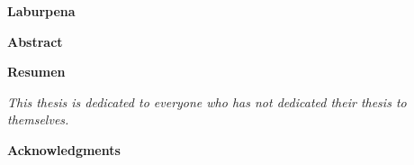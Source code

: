 \renewcommand{\thepage}{\roman{page}}
\cleardoublepage
\newpage
\begin{center}
  \vspace*{\fill}
  \begin{minipage}{1.0\textwidth}
    \begin{center}
     \textbf{Laburpena}\\
     \AbstractEusk
    \end{center}
    \begin{center}
     \textbf{Abstract}\\
     
    \end{center}
    \begin{center}
        \textbf{Resumen}\\
        
    \end{center}
  \end{minipage}
  \vspace*{\fill}
\end{center}

\clearpage
\begin{center}
    \textit{\Large{This thesis is dedicated to everyone who has not dedicated their thesis to themselves.}}
\end{center}

\clearpage
\begin{center}
    \textbf{Acknowledgments}\\
    
\end{center}


\cleardoublepage
\tableofcontents
\cleardoublepage
\listoffigures
\cleardoublepage
\listoftables
\cleardoublepage
\printacronyms[title={Abbreviations}]
\cleardoublepage
\setcounter{page}{1}
\renewcommand{\thepage}{\arabic{page}}
